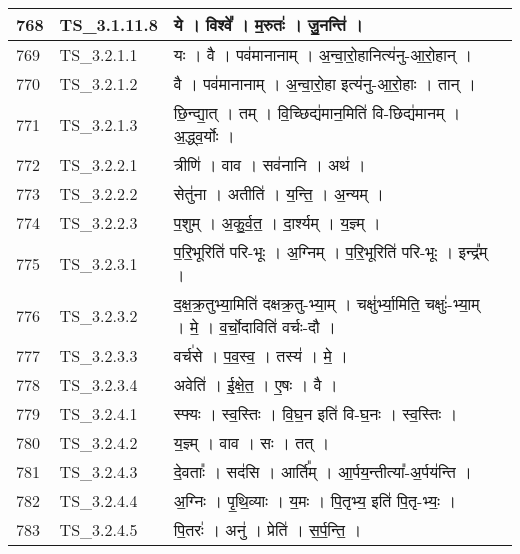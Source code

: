 \documentclass[17pt]{extarticle}
\begin{document}
\begin{longtable}{||p{0.4in}||p{0.9in}||p{4.0in}||p{0.9in}||}
        \hline
            768 & TS\_3.1.11.8 & ये   ।   विश्वे᳚   ।   म॒रुतः॑   ।   जु॒नन्ति॑   ।    &      \\
        \hline
            769 & TS\_3.2.1.1 & यः   ।   वै   ।   पव॑मानानाम्   ।   अ॒न्वा॒रो॒हानित्य॑नु{-}आ॒रो॒हान्   ।    &      \\
        \hline
            770 & TS\_3.2.1.2 & वै   ।   पव॑मानानाम्   ।   अ॒न्वा॒रो॒हा इत्य॑नु{-}आ॒रो॒हाः   ।   तान्   ।    &      \\
        \hline
            771 & TS\_3.2.1.3 & छि॒न्द्या॒त्   ।   तम्   ।   वि॒च्छिद्य॑मान॒मिति॑ वि{-}छिद्य॑मानम्   ।   अ॒द्ध्व॒र्योः   ।    &      \\
        \hline
            772 & TS\_3.2.2.1 & त्रीणि॑   ।   वाव   ।   सव॑नानि   ।   अथ॑   ।    &      \\
        \hline
            773 & TS\_3.2.2.2 & सेतु॑ना   ।   अतीति॑   ।   य॒न्ति॒   ।   अ॒न्यम्   ।    &      \\
        \hline
            774 & TS\_3.2.2.3 & प॒शुम्   ।   अ॒कु॒र्व॒त॒   ।   दा॒र्श्यम्   ।   य॒ज्ञ्म्   ।    &      \\
        \hline
            775 & TS\_3.2.3.1 & प॒रि॒भूरिति॑ परि{-}भूः   ।   अ॒ग्निम्   ।   प॒रि॒भूरिति॑ परि{-}भूः   ।   इन्द्र᳚म्   ।    &      \\
        \hline
            776 & TS\_3.2.3.2 & द॒क्ष॒क्र॒तुभ्या॒मिति॑ दक्षक्र॒तु{-}भ्या॒म्   ।   चक्षु॑र्भ्या॒मिति॒ चक्षुः॑{-}भ्या॒म्   ।   मे॒   ।   व॒र्चो॒दाविति॑ वर्चः{-}दौ   ।    &      \\
        \hline
            777 & TS\_3.2.3.3 & वर्च॑से   ।   प॒व॒स्व॒   ।   तस्य॑   ।   मे॒   ।    &      \\
        \hline
            778 & TS\_3.2.3.4 & अवेति॑   ।   ई॒क्षे॒त॒   ।   ए॒षः   ।   वै   ।    &      \\
        \hline
            779 & TS\_3.2.4.1 & स्फ्यः   ।   स्व॒स्तिः   ।   वि॒घ॒न इति॑ वि{-}घ॒नः   ।   स्व॒स्तिः   ।    &      \\
        \hline
            780 & TS\_3.2.4.2 & य॒ज्ञ्म्   ।   वाव   ।   सः   ।   तत्   ।    &      \\
        \hline
            781 & TS\_3.2.4.3 & दे॒वताः᳚   ।   सद॑सि   ।   आर्ति᳚म्   ।   आ॒र्पय॒न्तीत्या᳚{-}अ॒र्पय॑न्ति   ।    &      \\
        \hline
            782 & TS\_3.2.4.4 & अ॒ग्निः   ।   पृ॒थि॒व्याः   ।   य॒मः   ।   पि॒तृभ्य॒ इति॑ पि॒तृ{-}भ्यः॒   ।    &      \\
        \hline
            783 & TS\_3.2.4.5 & पि॒तरः॑   ।   अनु॑   ।   प्रेति॑   ।   स॒र्प॒न्ति॒   ।    &      \\

\end{longtable}
\end{document}
